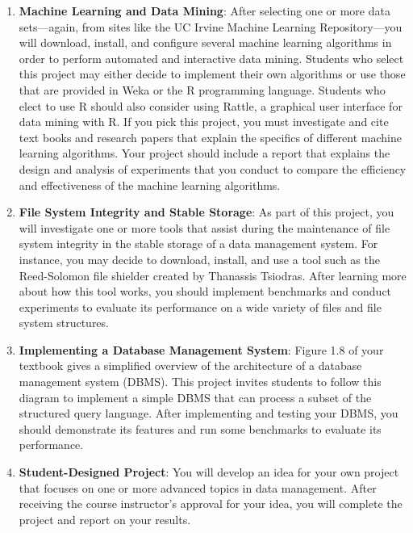 \begin{enumerate}
  \item {\bf Machine Learning and Data Mining}: After selecting one or more data sets---again, from sites like the UC
    Irvine Machine Learning Repository---you will download, install, and configure several machine learning algorithms
    in order to perform automated and interactive data mining.  Students who select this project may either decide to
    implement their own algorithms or use those that are provided in Weka or the R programming language.  Students who
    elect to use R should also consider using Rattle, a graphical user interface for data mining with R.  If you pick
    this project, you must investigate and cite text books and research papers that explain the specifics of different
    machine learning algorithms.  Your project should include a report that explains the design and analysis of
    experiments that you conduct to compare the efficiency and effectiveness of the machine learning algorithms.  

  \item {\bf File System Integrity and Stable Storage}: As part of this project, you will investigate one or more tools
    that assist during the maintenance of file system integrity in the stable storage of a data management system.  For
    instance, you may decide to download, install, and use a tool such as the Reed-Solomon file shielder created by
    Thanassis Tsiodras.  After learning more about how this tool works, you should implement benchmarks and conduct
    experiments to evaluate its performance on a wide variety of files and file system structures.  

  \item {\bf Implementing a Database Management System}: Figure 1.8 of your textbook gives a simplified overview of the
    architecture of a database management system (DBMS). This project invites students to follow this diagram to
    implement a simple DBMS that can process a subset of the structured query language. After implementing and testing
    your DBMS, you should demonstrate its features and run some benchmarks to evaluate its performance.

  \item {\bf Student-Designed Project}: You will develop an idea for your own project that focuses on one or more
    advanced topics in data management. After receiving the course instructor's approval for your idea, you will
    complete the project and report on your results.

\end{enumerate} 

